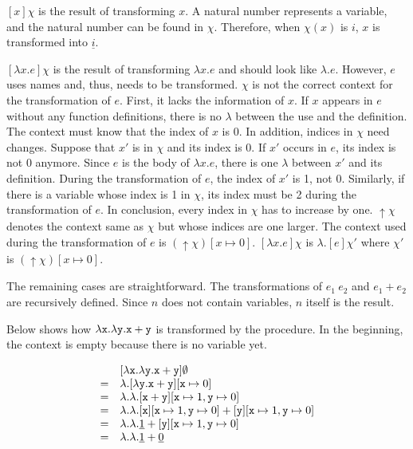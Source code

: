 $[x]\chi$ is the result of transforming $x$. A natural number represents a
variable, and the natural number can be found in $\chi$. Therefore, when
$\chi(x)$ is $i$, $x$ is transformed into $\underline{i}$.

$[\lambda x.e]\chi$ is the result of transforming $\lambda x.e$ and should look
like $\lambda.e$. However, $e$ uses names and, thus, needs to be transformed.
$\chi$ is not the correct context for the transformation of $e$. First, it lacks
the information of $x$. If $x$ appears in $e$ without any function definitions,
there is no $\lambda$ between the use and the definition. The context must know
that the index of $x$ is 0. In addition, indices in $\chi$ need changes. Suppose
that $x'$ is in $\chi$ and its index is 0. If $x'$ occurs in $e$, its index is
not 0 anymore. Since $e$ is the body of $\lambda x.e$, there is one $\lambda$
between $x'$ and its definition. During the transformation of $e$, the index of
$x'$ is 1, not 0. Similarly, if there is a variable whose index is 1 in $\chi$,
its index must be 2 during the transformation of $e$. In conclusion, every index
in $\chi$ has to increase by one. $\uparrow\chi$ denotes the context same as
$\chi$ but whose indices are one larger. The context used during the
transformation of $e$ is $(\uparrow\chi)[x\mapsto0]$. $[\lambda x.e]\chi$ is
$\lambda.[e]{\chi'}$ where $\chi'$ is $(\uparrow\chi)[x\mapsto0]$.

The remaining cases are straightforward. The transformations of $e_1\ e_2$ and
$e_1+e_2$ are recursively defined. Since $n$ does not contain variables, $n$
itself is the result.

Below shows how $\lambda \texttt{x}.\lambda \texttt{y}.\texttt{x}+\texttt{y}$ is transformed
by the procedure. In the beginning, the context is empty because there is no
variable yet.

\[
\begin{array}{cl}
& [\lambda \texttt{x}.\lambda \texttt{y}.\texttt{x}+\texttt{y}]\emptyset \\
= & \lambda.[\lambda \texttt{y}.\texttt{x}+\texttt{y}][\texttt{x}\mapsto 0] \\
= & \lambda.\lambda.[\texttt{x}+\texttt{y}][\texttt{x}\mapsto 1,\texttt{y}\mapsto 0] \\
= & \lambda.\lambda.[\texttt{x}][\texttt{x}\mapsto 1,\texttt{y}\mapsto 0]+[\texttt{y}][\texttt{x}
\mapsto 1,\texttt{y}\mapsto 0] \\
= & \lambda.\lambda.\underline{1}+[\texttt{y}][\texttt{x}\mapsto 1,\texttt{y}\mapsto 0] \\
= & \lambda.\lambda.\underline{1}+\underline{0} \\
\end{array}
\]

